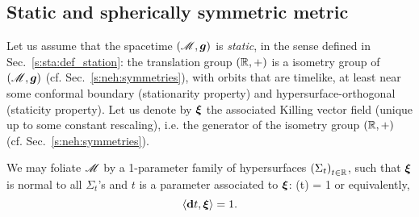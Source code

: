 \subsection{Static and spherically symmetric metric} \label{s:sch:static_spher}

Let us assume that the spacetime $(\mathscr{M},\bm{g})$ is \emph{static}, in the sense defined in Sec.~\ref{s:sta:def_station}:
the translation group $(\mathbb{R},+)$ is a isometry group of $(\mathscr{M},\bm{g})$
(cf. Sec.~\ref{s:neh:symmetries}), with orbits that are timelike, at least near
some conformal boundary (stationarity property) and hypersurface-orthogonal (staticity property). Let us denote by $\bm{\xi}$ the associated Killing vector
field (unique up to some constant rescaling), i.e. the generator of the
isometry group $(\mathbb{R},+)$ (cf. Sec.~\ref{s:neh:symmetries}).

We may foliate $\mathscr{M}$ by a 1-parameter family of hypersurfaces
$\left(\Sigma_t\right)_{t\in\mathbb{R}}$, such that $\bm{\xi}$ is normal to
all $\Sigma_t$'s and $t$ is a parameter associated to $\bm{\xi}$:
\be \label{e:sch:xi_t}
    \w{\xi}(t) = 1
\ee
or equivalently,
\[
    \langle \mathbf{d} t , \bm{\xi} \rangle = 1.
\]

